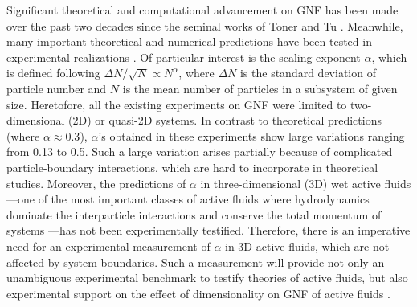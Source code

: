 \documentclass[twocolumn,aps,prx,amsmath,amssymb,longbibliography]{revtex4-2}
\begin{document}
Significant theoretical and computational advancement on GNF has been made over the past two decades since the seminal works of Toner and Tu \cite{Toner1995,Tu1998,Toner1998,AditiSimha2002,Ramaswamy2003,Toner2005,Chate2008,Mishra2010,
Dey2012,Saintillan2012,Saintillan2013,Ngo2014,Mahault2019}. Meanwhile, many important theoretical and numerical predictions have been tested in experimental realizations
\cite{Narayan2007, Aranson2008, Deseigne2010, Zhang2010, Schaller2013,
Nishiguchi2017, Kawaguchi2017, Palacci2013}.
Of particular interest is the scaling exponent $\alpha$, which is defined following $\Delta N /\sqrt N \propto N^\alpha$, where $\Delta N$ is the standard deviation of particle number and $N$ is the mean number of particles in a subsystem of given size. Heretofore, all the existing experiments on GNF were limited to two-dimensional (2D) or quasi-2D systems. In contrast to theoretical predictions (where $\alpha \approx 0.3$), $\alpha$'s obtained in these experiments show large variations ranging from 0.13 to 0.5. Such a large variation arises partially because of complicated particle-boundary interactions, which are hard to incorporate in theoretical studies. Moreover, the predictions of $\alpha$ in three-dimensional (3D) wet active fluids---one of the most important classes of active fluids where hydrodynamics dominate the interparticle interactions and conserve the total momentum of systems \cite{Marchetti2013}---has not been experimentally testified. Therefore, there is an imperative need for an experimental measurement of $\alpha$ in 3D active fluids, which are not affected by system boundaries. Such a measurement will provide not only an unambiguous experimental benchmark to testify theories of active fluids, but also experimental support on the effect of dimensionality on GNF of active fluids \cite{Marchetti2013}.
\end{document}

